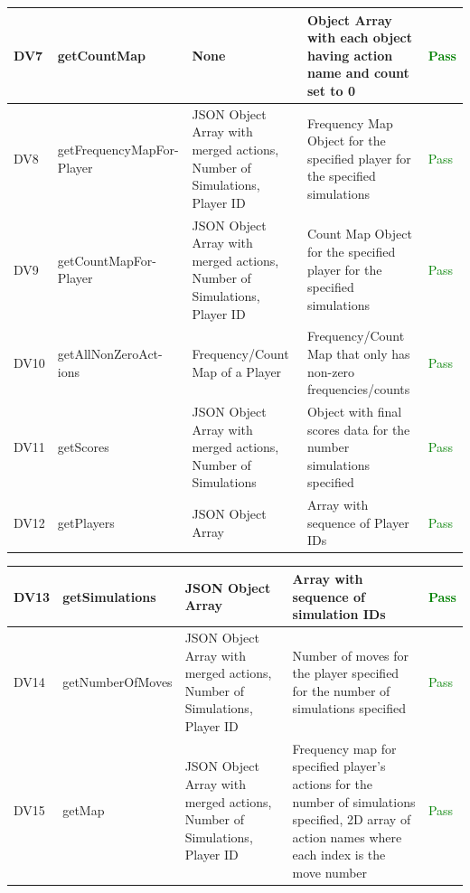 \documentclass[12pt, titlepage]{article}
\begin{document}
\begin{table}[!ht]
\begin{tabular}{| P{3em} | P{9em} | P{7em} | P{7em} | P{7em} |}
    \hline
    DV7 & getCountMap & None & Object Array with each object having action name and count set to 0 & \textcolor{green}{Pass} \\ \hline
        DV8 & getFrequencyMapFor- Player & JSON Object Array with merged actions, Number of Simulations, Player ID & Frequency Map Object for the specified player for the specified simulations & \textcolor{green}{Pass} \\ \hline
     DV9 & getCountMapFor- Player & JSON Object Array with merged actions, Number of Simulations, Player ID & Count Map Object for the specified player for the specified simulations & \textcolor{green}{Pass} \\ \hline
        DV10 & getAllNonZeroAct- ions & Frequency/Count Map of a Player & Frequency/Count Map that only has non-zero frequencies/counts & \textcolor{green}{Pass} \\ \hline
        DV11 & getScores & JSON Object Array with merged actions, Number of Simulations & Object with final scores data for the number simulations specified & \textcolor{green}{Pass} \\ \hline
        DV12 & getPlayers & JSON Object Array & Array with sequence of Player IDs & \textcolor{green}{Pass} \\ \hline
\end{tabular}
\end{table}

\newpage
\begin{table}[!ht]
\begin{tabular}{| P{3em} | P{9em} | P{7em} | P{7em} | P{7em} |}
    \hline
        DV13 & getSimulations & JSON Object Array & Array with sequence of simulation IDs & \textcolor{green}{Pass} \\ \hline
        DV14 & getNumberOfMoves & JSON Object Array with merged actions, Number of Simulations, Player ID & Number of moves for the player specified for the number of simulations specified & \textcolor{green}{Pass} \\ \hline
        DV15 & getMap & JSON Object Array with merged actions, Number of Simulations, Player ID & Frequency map for specified player's actions for the number of simulations specified, 2D array of action names where each index is the move number & \textcolor{green}{Pass} \\ \hline
\end{tabular}
\end{table}
\end{document}
